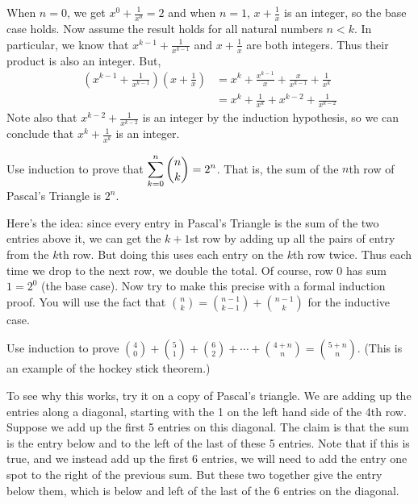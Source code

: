 \begin{questions}
	\begin{answer}
		When $n = 0$, we get $x^0 +\frac{1}{x^0} = 2$ and when $n = 1$, $x + \frac{1}{x}$ is an integer, so the base case holds.  Now assume the result holds for all natural numbers $n < k$.  In particular, we know that $x^{k-1} + \frac{1}{x^{k-1}}$ and $x + \frac{1}{x}$ are both integers.  Thus their product is also an integer.  But,
		\begin{align*}
		\left(x^{k-1} + \frac{1}{x^{k-1}}\right)\left(x + \frac{1}{x}\right) & = x^k + \frac{x^{k-1}}{x} + \frac{x}{x^{k-1}} + \frac{1}{x^k}\\
		& = x^k + \frac{1}{x^k} + x^{k-2} + \frac{1}{x^{k-2}}
		\end{align*}
		Note also that $x^{k-2} + \frac{1}{x^{k-2}}$ is an integer by the induction hypothesis, so we can conclude that $x^k + \frac{1}{x^k}$ is an integer.
		

	\end{answer}
	

	
\question Use induction to prove that $\displaystyle\sum_{k=0}^n {n \choose k} = 2^n$.  That is, the sum of the $n$th row of Pascal's Triangle is $2^n$.

	\begin{answer}
		Here's the idea: since every entry in Pascal's Triangle is the sum of the two entries above it, we can get the $k+1$st row by adding up all the pairs of entry from the $k$th row.  But doing this uses each entry on the $k$th row twice.  Thus each time we drop to the next row, we double the total.  Of course, row 0 has sum $1 = 2^0$ (the base case).  Now try to make this precise with a formal induction proof.  You will use the fact that ${n \choose k} = {n-1 \choose k-1} + {n-1 \choose k}$ for the inductive case.
	\end{answer}
	
\question Use induction to prove ${4 \choose 0} + {5 \choose 1} + {6 \choose 2} + \cdots + {4+n \choose n} = {5+n \choose n}$.  (This is an example of the hockey stick theorem.)

	\begin{answer}
		To see why this works, try it on a copy of Pascal's triangle.  We are adding up the entries along a diagonal, starting with the 1 on the left hand side of the 4th row.  Suppose we add up the first 5 entries on this diagonal.  The claim is that the sum is the entry below and to the left of the last of these 5 entries.  Note that if this is true, and we instead add up the first 6 entries, we will need to add the entry one spot to the right of the previous sum.  But these two together give the entry below them, which is below and left of the last of the 6 entries on the diagonal.
		

\end{answer}
\end{questions}
